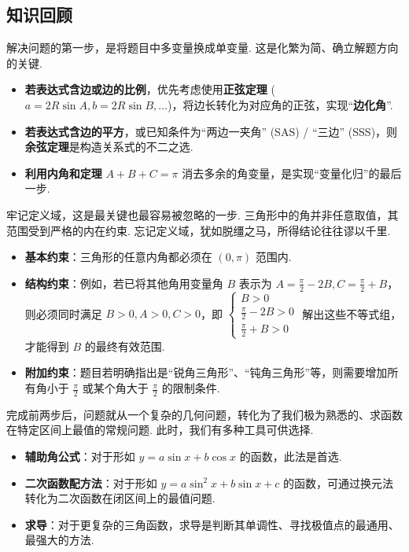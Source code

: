 \documentclass[12pt,a4paper]{ctexbook}
\theoremstyle{definition}
\theoremstyle{remark}
\begin{document}
	\subsection{知识回顾}
	解决问题的第一步，是将题目中多变量换成单变量. 这是化繁为简、确立解题方向的关键.
	\begin{itemize}
		\item \textbf{若表达式含边或边的比例}，优先考虑使用\textbf{正弦定理} ($a=2R\sin A, b=2R\sin B, \dots$)，将边长转化为对应角的正弦，实现“\textbf{边化角}”.
		\item \textbf{若表达式含边的平方}，或已知条件为“两边一夹角” (SAS) / “三边” (SSS)，则\textbf{余弦定理}是构造关系式的不二之选. 
		\item \textbf{利用内角和定理} $A+B+C=\pi$ 消去多余的角变量，是实现“变量化归”的最后一步.
	\end{itemize}
	
	牢记定义域，这是最关键也最容易被忽略的一步. 三角形中的角并非任意取值，其范围受到严格的内在约束. 忘记定义域，犹如脱缰之马，所得结论往往谬以千里.
	\begin{itemize}
		\item \textbf{基本约束}：三角形的任意内角都必须在 $(0, \pi)$ 范围内.
		\item \textbf{结构约束}：例如，若已将其他角用变量角 $B$ 表示为 $A=\frac{\pi}{2}-2B, C=\frac{\pi}{2}+B$，则必须同时满足 $B>0, A>0, C>0$，即
		$\begin{cases} B>0 \\ \frac{\pi}{2}-2B>0 \\ \frac{\pi}{2}+B>0 \end{cases}$
		解出这些不等式组，才能得到 $B$ 的最终有效范围.
		\item \textbf{附加约束}：题目若明确指出是“锐角三角形”、“钝角三角形”等，则需要增加所有角小于 $\frac{\pi}{2}$ 或某个角大于 $\frac{\pi}{2}$ 的限制条件.
	\end{itemize}
	
	完成前两步后，问题就从一个复杂的几何问题，转化为了我们极为熟悉的、求函数在特定区间上最值的常规问题. 此时，我们有多种工具可供选择.
	\begin{itemize}
		\item \textbf{辅助角公式}：对于形如 $y=a\sin x + b\cos x$ 的函数，此法是首选.
		\item \textbf{二次函数配方法}：对于形如 $y=a\sin^2 x + b\sin x + c$ 的函数，可通过换元法转化为二次函数在闭区间上的最值问题.
		\item \textbf{求导}：对于更复杂的三角函数，求导是判断其单调性、寻找极值点的最通用、最强大的方法.
	\end{itemize}
\end{document}
